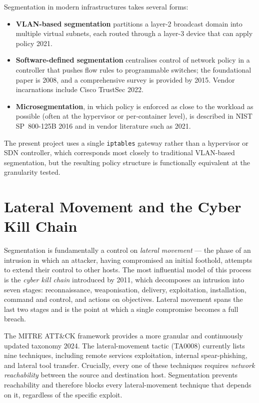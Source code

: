 Segmentation in modern infrastructures takes several forms:

\begin{itemize}[leftmargin=*]
    \item \textbf{VLAN-based segmentation} partitions a layer-2 broadcast domain into multiple virtual subnets, each routed through a layer-3 device that can apply policy \parencite{Tanenbaum and Wetherall}{2021}.
    \item \textbf{Software-defined segmentation} centralises control of network policy in a controller that pushes flow rules to programmable switches; the foundational paper is \textcite{McKeown et al.}{2008}, and a comprehensive survey is provided by \textcite{Kreutz et al.}{2015}. Vendor incarnations include Cisco TrustSec \parencite{Cisco}{2022}.
    \item \textbf{Microsegmentation}, in which policy is enforced as close to the workload as possible (often at the hypervisor or per-container level), is described in NIST SP~800-125B \parencite{NIST}{2016} and in vendor literature such as \textcite{VMware}{2021}.
\end{itemize}

The present project uses a single \texttt{iptables} gateway rather than a hypervisor or SDN controller, which corresponds most closely to traditional VLAN-based segmentation, but the resulting policy structure is functionally equivalent at the granularity tested.

\section{Lateral Movement and the Cyber Kill Chain}

Segmentation is fundamentally a control on \emph{lateral movement} --- the phase of an intrusion in which an attacker, having compromised an initial foothold, attempts to extend their control to other hosts. The most influential model of this process is the \emph{cyber kill chain} introduced by \textcite{Hutchins, Cloppert and Amin}{2011}, which decomposes an intrusion into seven stages: reconnaissance, weaponisation, delivery, exploitation, installation, command and control, and actions on objectives. Lateral movement spans the last two stages and is the point at which a single compromise becomes a full breach.

The MITRE ATT\&CK framework provides a more granular and continuously updated taxonomy \parencite{MITRE}{2024}. The lateral-movement tactic (TA0008) currently lists nine techniques, including remote services exploitation, internal spear-phishing, and lateral tool transfer. Crucially, every one of these techniques requires \emph{network reachability} between the source and destination host. Segmentation prevents reachability and therefore blocks every lateral-movement technique that depends on it, regardless of the specific exploit.

